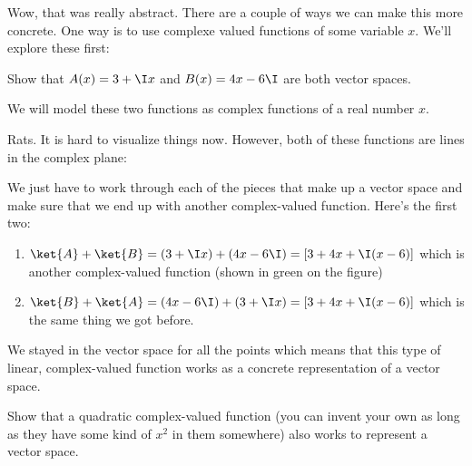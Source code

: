Wow, that was really abstract. There are a couple of ways we can make this more concrete. One way is to use complexe valued functions of some variable $x$. We'll explore these first:

\begin{example}
Show that $A(x) = 3+ \I x$ and $B(x) = 4 x - 6\I$ are both vector spaces.

\model We will model these two functions as complex functions of a real number $x$.

\vis Rats. It is hard to visualize things now. However, both of these functions are lines in the complex plane:
\begin{figure}
\centering
{}
\end{figure}

\sol We just have to work through each of the pieces that make up a vector space and make sure that we end up with another complex-valued function. Here's the first two:
\begin{enumerate}
\item $\ket{A} + \ket{B} =  (3+ \I x) + (4 x - 6\I) = [3+4x + \I(x-6)]$ which is another complex-valued function (shown in green on the figure)
\item $\ket{B} + \ket{A} =   (4 x - 6\I) + (3+ \I x)  = [3+4x + \I(x-6)]$ which is the same thing we got before.
\end{enumerate}
\assess We stayed in the vector space for all the points which means that this type of linear, complex-valued function works as a concrete representation of a vector space.
\end{example}

\begin{exercise}
Show that a quadratic complex-valued function (you can invent your own as long as they have some kind of $x^2$ in them somewhere) also works to represent a vector space.
\end{exercise}

